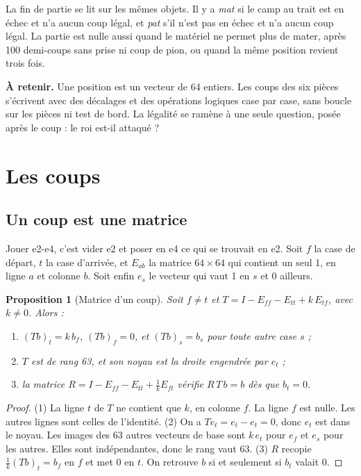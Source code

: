 \documentclass[11pt,a4paper]{article}
\theoremstyle{plain}
\newtheorem{proposition}{Proposition}
\begin{document}
La fin de partie se lit sur les mêmes objets. Il y a \emph{mat} si le camp au trait est en échec
et n'a aucun coup légal, et \emph{pat} s'il n'est pas en échec et n'a aucun coup légal. La partie
est nulle aussi quand le matériel ne permet plus de mater, après 100 demi-coups sans prise ni
coup de pion, ou quand la même position revient trois fois.

\begin{note}
\textbf{À retenir.} Une position est un vecteur de 64 entiers. Les coups des six pièces s'écrivent
avec des décalages et des opérations logiques case par case, sans boucle sur les pièces ni test de
bord. La légalité se ramène à une seule question, posée après le coup : le roi est-il attaqué ?
\end{note}

\section{Les coups}

\subsection{Un coup est une matrice}\label{th:coup}
Jouer e2-e4, c'est vider e2 et poser en e4 ce qui se trouvait en e2. Soit $f$ la case de départ,
$t$ la case d'arrivée, et $E_{ab}$ la matrice $64\times64$ qui contient un seul 1, en ligne $a$
et colonne $b$. Soit enfin $e_s$ le vecteur qui vaut 1 en $s$ et 0 ailleurs.

\begin{proposition}[Matrice d'un coup]\label{prop:coup}
Soit $f \ne t$ et $T = I - E_{ff} - E_{tt} + k\,E_{tf}$, avec $k \ne 0$. Alors :
\begin{enumerate}
\item $(Tb)_t = k\,b_f$, $(Tb)_f = 0$, et $(Tb)_s = b_s$ pour toute autre case $s$ ;
\item $T$ est de rang 63, et son noyau est la droite engendrée par $e_t$ ;
\item la matrice $R = I - E_{ff} - E_{tt} + \tfrac1k E_{ft}$ vérifie $R\,T\,b = b$ dès que
$b_t = 0$.
\end{enumerate}
\end{proposition}
\begin{proof}
(1) La ligne $t$ de $T$ ne contient que $k$, en colonne $f$. La ligne $f$ est nulle. Les autres
lignes sont celles de l'identité. (2) On a $T e_t = e_t - e_t = 0$, donc $e_t$ est dans le noyau.
Les images des 63 autres vecteurs de base sont $k\,e_t$ pour $e_f$ et $e_s$ pour les autres. Elles
sont indépendantes, donc le rang vaut 63. (3) $R$ recopie $\tfrac1k (Tb)_t = b_f$ en $f$ et met 0
en $t$. On retrouve $b$ si et seulement si $b_t$ valait 0.
\end{proof}
\end{document}
